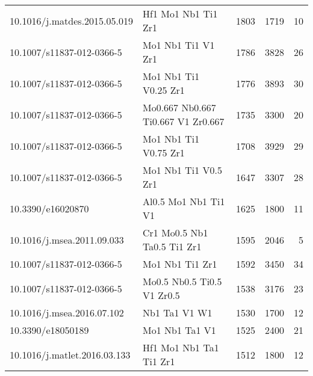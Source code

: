 \begin{tabular}{llrrr}
  10.1016/j.matdes.2015.05.019 &                          Hf1 Mo1 Nb1 Ti1 Zr1 &                1803 &                 1719 &                        10 \\
     10.1007/s11837-012-0366-5 &                           Mo1 Nb1 Ti1 V1 Zr1 &                1786 &                 3828 &                        26 \\
     10.1007/s11837-012-0366-5 &                        Mo1 Nb1 Ti1 V0.25 Zr1 &                1776 &                 3893 &                        30 \\
     10.1007/s11837-012-0366-5 &           Mo0.667 Nb0.667 Ti0.667 V1 Zr0.667 &                1735 &                 3300 &                        20 \\
     10.1007/s11837-012-0366-5 &                        Mo1 Nb1 Ti1 V0.75 Zr1 &                1708 &                 3929 &                        29 \\
     10.1007/s11837-012-0366-5 &                         Mo1 Nb1 Ti1 V0.5 Zr1 &                1647 &                 3307 &                        28 \\
             10.3390/e16020870 &                         Al0.5 Mo1 Nb1 Ti1 V1 &                1625 &                 1800 &                        11 \\
    10.1016/j.msea.2011.09.033 &                  Cr1 Mo0.5 Nb1 Ta0.5 Ti1 Zr1 &                1595 &                 2046 &                         5 \\
     10.1007/s11837-012-0366-5 &                              Mo1 Nb1 Ti1 Zr1 &                1592 &                 3450 &                        34 \\
     10.1007/s11837-012-0366-5 &                   Mo0.5 Nb0.5 Ti0.5 V1 Zr0.5 &                1538 &                 3176 &                        23 \\
    10.1016/j.msea.2016.07.102 &                                Nb1 Ta1 V1 W1 &                1530 &                 1700 &                        12 \\
             10.3390/e18050189 &                               Mo1 Nb1 Ta1 V1 &                1525 &                 2400 &                        21 \\
  10.1016/j.matlet.2016.03.133 &                      Hf1 Mo1 Nb1 Ta1 Ti1 Zr1 &                1512 &                 1800 &                        12 \\
\bottomrule
\end{tabular}
